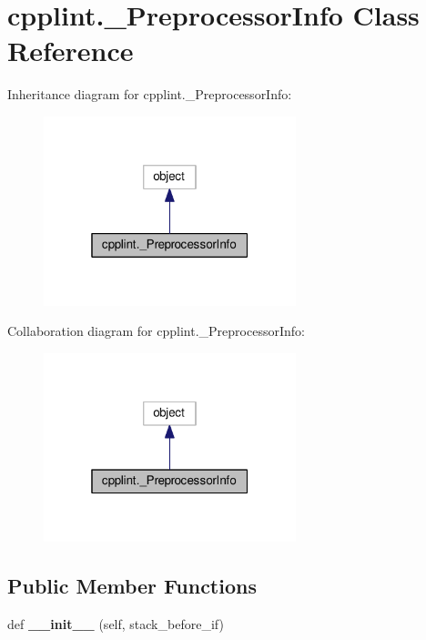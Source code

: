 \hypertarget{classcpplint_1_1__PreprocessorInfo}{}\section{cpplint.\+\_\+\+Preprocessor\+Info Class Reference}
\label{classcpplint_1_1__PreprocessorInfo}


Inheritance diagram for cpplint.\+\_\+\+Preprocessor\+Info\+:
\nopagebreak
\begin{figure}[H]
\begin{center}
\leavevmode
\includegraphics[width=208pt]{classcpplint_1_1__PreprocessorInfo__inherit__graph}
\end{center}
\end{figure}


Collaboration diagram for cpplint.\+\_\+\+Preprocessor\+Info\+:
\nopagebreak
\begin{figure}[H]
\begin{center}
\leavevmode
\includegraphics[width=208pt]{classcpplint_1_1__PreprocessorInfo__coll__graph}
\end{center}
\end{figure}
\subsection*{Public Member Functions}
\begin{DoxyCompactItemize}
\item 
def {\bfseries \+\_\+\+\_\+init\+\_\+\+\_\+} (self, stack\+\_\+before\+\_\+if)\hypertarget{classcpplint_1_1__PreprocessorInfo_a1394d17434a22d32b0ea9d6424e5c47b}{}\label{classcpplint_1_1__PreprocessorInfo_a1394d17434a22d32b0ea9d6424e5c47b}

\end{DoxyCompactItemize}
